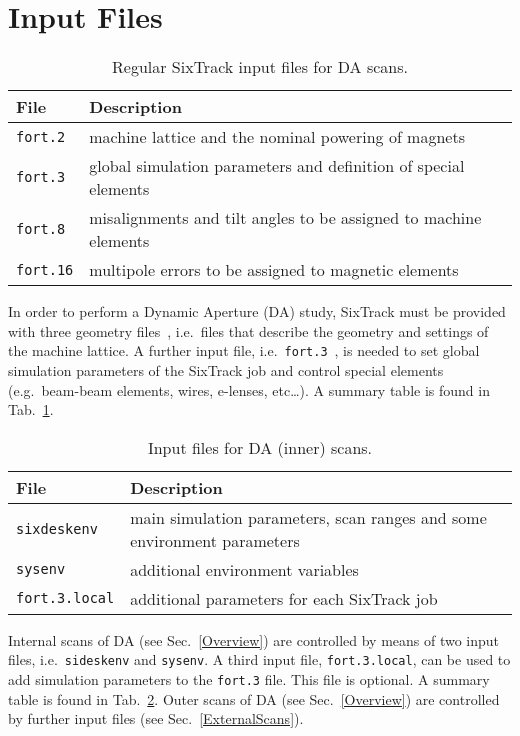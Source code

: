 \section{Input Files}
\label{Sec:InputFiles}
\begin{table}[h]
\begin{center}
    \caption{Regular SixTrack input files for DA scans.}
    \label{tab:6TinpFiles}
    \begin{tabular}{|l|l|}
    \hline
    \rowcolor{blue!30}
    \textbf{File} & \textbf{Description} \\
    \hline
    \texttt{fort.2} & machine lattice and the nominal powering of magnets \\
    \hline
    \texttt{fort.3} & global simulation parameters and definition of special elements \\
    \hline
    \texttt{fort.8} & misalignments and tilt angles to be assigned to machine elements \\
    \hline
    \texttt{fort.16} & multipole errors to be assigned to magnetic elements \\
    \hline
    \end{tabular}
\end{center}
\end{table}
In order to perform a Dynamic Aperture (DA) study, SixTrack must be
provided with three geometry files~\cite{SixTrack_user_manual},
i.e.~files that describe the geometry and settings of the machine lattice.
A further input file, i.e.~\texttt{fort.3}~\cite{SixTrack_user_manual},
is needed to set global simulation parameters of the SixTrack job and
control special elements (e.g.~beam-beam elements, wires,
e-lenses, etc\ldots).
A summary table is found in Tab.~\ref{tab:6TinpFiles}.

\begin{table}[h]
\begin{center}
    \caption{Input files for DA (inner) scans.}
    \label{tab:InnerScanInputFiles}
    \begin{tabular}{|l|l|}
    \hline
    \rowcolor{blue!30}
    \textbf{File} & \textbf{Description} \\
    \hline
    \texttt{sixdeskenv} & main simulation parameters, scan ranges and some environment parameters \\
    \hline
    \texttt{sysenv} & additional environment variables \\
    \hline
    \texttt{fort.3.local} & additional parameters for each SixTrack job \\
    \hline
    \end{tabular}
\end{center}
\end{table}
Internal scans of DA (see Sec.~\ref{Overview}) are controlled by means of two input
files, i.e.~\texttt{sideskenv} and \texttt{sysenv}. A third input file,
\texttt{fort.3.local}, can be used to add simulation parameters to
the \texttt{fort.3} file. This file is optional.
A summary table is found in Tab.~\ref{tab:InnerScanInputFiles}.
Outer scans of DA (see Sec.~\ref{Overview}) are controlled by further input files
(see Sec.~\ref{ExternalScans}).

